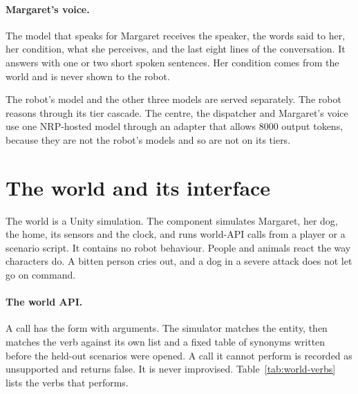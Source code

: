 \paragraph{Margaret's voice.} The model that speaks for Margaret receives the speaker, the words said
to her, her condition, what she perceives, and the last eight lines of the conversation. It answers
with one or two short spoken sentences. Her condition comes from the world and is never shown to the
robot.

The robot's model and the other three models are served separately. The robot reasons through its
tier cascade. The centre, the dispatcher and Margaret's voice use one NRP-hosted model through an
adapter that allows 8000 output tokens, because they are not the robot's models and so are not on
its tiers.

\section{The world and its interface}\label{sec:home-world}

The world is a Unity simulation. The component  simulates Margaret, her dog, the
home, its sensors and the clock, and runs world-API calls from a player or a scenario script. It
contains no robot behaviour. People and animals react the way characters do. A bitten person cries
out, and a dog in a severe attack does not let go on command.

\paragraph{The world API.} A call has the form  with arguments. The simulator
matches the entity, then matches the verb against its own list and a fixed table of synonyms written
before the held-out scenarios were opened. A call it cannot perform is recorded as unsupported and
returns false. It is never improvised. Table~\ref{tab:world-verbs} lists the verbs that
 performs.

